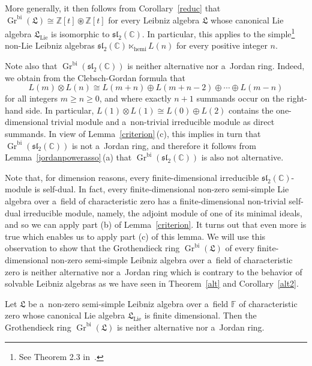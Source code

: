 \documentclass{jonasart}
\DeclareMathOperator{\bi}{bi}
\DeclareMathOperator{\hemi}{hemi}
\DeclareMathOperator{\K}{Gr}
\DeclareMathOperator{\lie}{Lie}
\newcommand{\cbb}{\mathbb{C}}
\newcommand{\fbb}{\mathbb{F}}
\newcommand{\lf}{\mathfrak{L}}
\newcommand{\slf}{\mathfrak{sl}}
\newcommand{\zbb}{\mathbb{Z}}
\begin{document}
\begin{example}
		{More generally, it then follows from Corollary~\ref{reduc} that $\K^{\bi}(\lf)
		\cong\zbb[t]\circledast\zbb[t]$ for every Leibniz algebra $\lf$ whose canonical
		Lie algebra $\lf_{\lie}$ is isomorphic to $\slf_2 (\cbb)$. In particular, this applies to the simple\footnote{See Theorem 2.3 in~\cite{F2}.} non-Lie Leibniz algebras
		$\slf_2 (\cbb)\ltimes_{\hemi} L(n)$ for every positive integer $n$.}

		{Note also that $\K^{\bi}(\slf_2 (\cbb))$ is neither alternative nor a~Jordan ring. Indeed, we obtain from the Clebsch-Gordan formula that}
		\[
			L(m)\otimes L(n)\cong L(m+n)\oplus L(m+n-2)\oplus\dotsb\oplus L(m-n)
		\]
		{for all integers $m\geq n\ge 0$, and where exactly $n+1$ summands occur on the right-hand side. In particular, $L(1)\otimes L(1)\cong L(0)\oplus
		L(2)$ contains the one-dimensional trivial module and a~non-trivial irreducible module as direct summands. In view of Lemma~\ref{criterion}\,(c), this implies in turn that $\K^{\bi}(\slf_2 (\cbb))$ is not a~Jordan ring, and therefore it follows from Lemma~\ref{jordanpowerasso}\,(a) that $\K^{\bi}(\slf_2 (\cbb))$ is also not alternative.}
	\end{example}
	Note that, for dimension reasons, every finite-dimensional irreducible
	$\slf_2 (\cbb)$-mo\-dule is self-dual. In fact, every finite-dimensional non-zero semi-simple Lie algebra over a~field of characteristic zero has a finite-dimensional non-trivial self-dual irreducible module, namely, the adjoint module of one of its minimal ideals, and so we can apply part (b)
	of Lemma~\ref{criterion}. It turns out that even more is true which enables us to apply part (c) of this lemma. We will use this observation to show that the Grothendieck ring $\K^{\bi}(\lf)$ of every finite-dimensional non-zero semi-simple Leibniz algebra over a~field of characteristic zero is neither alternative nor a~Jordan ring which is contrary to the behavior of solvable
	Leibniz algebras as we have seen in Theorem~\ref{alt} and Corollary~\ref{alt2}.
	\begin{theorem}\label{nonalt}
		Let $\lf$ be a~non-zero semi-simple Leibniz algebra over a~field
		$\fbb$ of characteristic zero whose canonical Lie algebra $\lf_{\lie}$
		is finite dimensional. Then the Grothendieck ring $\K^{\bi}(\lf)$ is neither alternative nor a~Jordan ring.
	\end{theorem}
\end{document}

